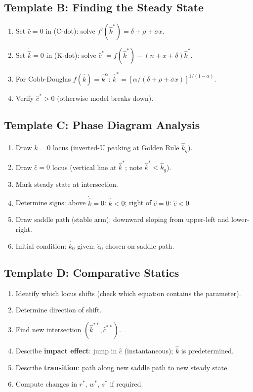 \documentclass[a4paper,11pt]{article}
\newcommand{\khat}{\hat{k}}
\newcommand{\chat}{\hat{c}}
\begin{document}
\subsection*{Template B: Finding the Steady State}
\begin{enumerate}[leftmargin=*]
  \item Set $\dot{\chat} = 0$ in (C-dot): solve $f'(\khat^*) = \delta + \rho + \sigma x$.
  \item Set $\dot{\khat} = 0$ in (K-dot): solve $\chat^* = f(\khat^*) - (n+x+\delta)\khat^*$.
  \item For Cobb-Douglas $f(\khat) = \khat^\alpha$: $\khat^* = [\alpha/(\delta+\rho+\sigma x)]^{1/(1-\alpha)}$.
  \item Verify $\chat^* > 0$ (otherwise model breaks down).
\end{enumerate}

\subsection*{Template C: Phase Diagram Analysis}
\begin{enumerate}[leftmargin=*]
  \item Draw $\dot{\khat}=0$ locus (inverted-U peaking at Golden Rule $\khat_g$).
  \item Draw $\dot{\chat}=0$ locus (vertical line at $\khat^*$; note $\khat^* < \khat_g$).
  \item Mark steady state at intersection.
  \item Determine signs: above $\dot{\khat}=0$: $\dot{\khat}<0$; right of $\dot{\chat}=0$: $\dot{\chat}<0$.
  \item Draw saddle path (stable arm): downward sloping from upper-left and lower-right.
  \item Initial condition: $\khat_0$ given; $\chat_0$ chosen on saddle path.
\end{enumerate}

\subsection*{Template D: Comparative Statics}
\begin{enumerate}[leftmargin=*]
  \item Identify which locus shifts (check which equation contains the parameter).
  \item Determine direction of shift.
  \item Find new intersection $(\khat^{**}, \chat^{**})$.
  \item Describe \textbf{impact effect}: jump in $\chat$ (instantaneous); $\khat$ is predetermined.
  \item Describe \textbf{transition}: path along new saddle path to new steady state.
  \item Compute changes in $r^*$, $w^*$, $s^*$ if required.
\end{enumerate}
\end{document}
